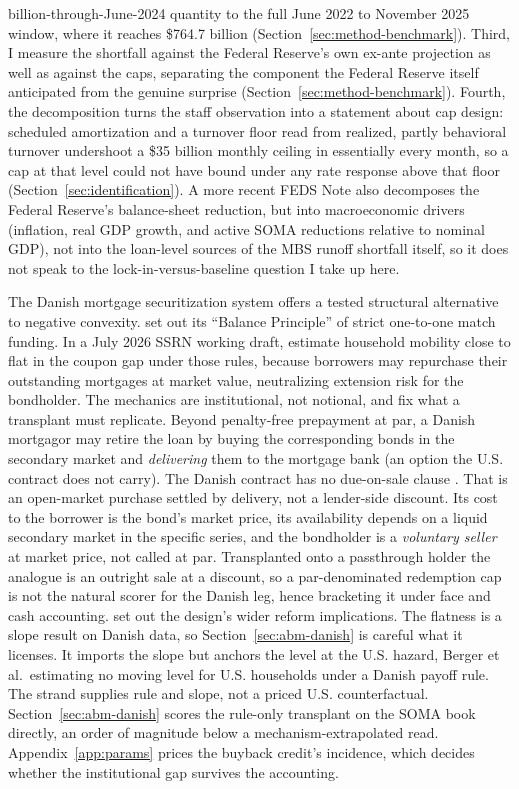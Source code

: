 \documentclass[12pt]{article}
\begin{document}
billion-through-June-2024 quantity to the full June 2022 to November 2025 window, where it reaches \$764.7 billion (Section~\ref{sec:method-benchmark}). Third, I measure the shortfall against the Federal Reserve's own ex-ante projection as well as against the caps, separating the component the Federal Reserve itself anticipated from the genuine surprise (Section~\ref{sec:method-benchmark}). Fourth, the decomposition turns the staff observation into a statement about cap design: scheduled amortization and a turnover floor read from realized, partly behavioral turnover undershoot a \$35 billion monthly ceiling in essentially every month, so a cap at that level could not have bound under any rate response above that floor (Section~\ref{sec:identification}). A more recent \citet{eyal2026} FEDS Note also decomposes the Federal Reserve's balance-sheet reduction, but into macroeconomic drivers (inflation, real GDP growth, and active SOMA reductions relative to nominal GDP), not into the loan-level sources of the MBS runoff shortfall itself, so it does not speak to the lock-in-versus-baseline question I take up here.

The Danish mortgage securitization system offers a tested structural alternative to negative convexity. \citet{berg2018} set out its ``Balance Principle'' of strict one-to-one match funding. In a July 2026 SSRN working draft, \citet[\S3.3.2]{berger2026} estimate household mobility close to flat in the coupon gap under those rules, because borrowers may repurchase their outstanding mortgages at market value, neutralizing extension risk for the bondholder. The mechanics are institutional, not notional, and fix what a transplant must replicate. Beyond penalty-free prepayment at par, a Danish mortgagor may retire the loan by buying the corresponding bonds in the secondary market and \emph{delivering} them to the mortgage bank (an option the U.S. contract does not carry). The Danish contract has no due-on-sale clause \citep{frankel2004}. That is an open-market purchase settled by delivery, not a lender-side discount. Its cost to the borrower is the bond's market price, its availability depends on a liquid secondary market in the specific series, and the bondholder is a \emph{voluntary seller} at market price, not called at par. Transplanted onto a passthrough holder the analogue is an outright sale at a discount, so a par-denominated redemption cap is not the natural scorer for the Danish leg, hence bracketing it under face and cash accounting. \citet{svenstrup2006} set out the design's wider reform implications. The flatness is a slope result on Danish data, so Section~\ref{sec:abm-danish} is careful what it licenses. It imports the slope but anchors the level at the U.S. hazard, Berger et al.\ estimating no moving level for U.S. households under a Danish payoff rule. The strand supplies rule and slope, not a priced U.S. counterfactual. Section~\ref{sec:abm-danish} scores the rule-only transplant on the SOMA book directly, an order of magnitude below a mechanism-extrapolated read. Appendix~\ref{app:params} prices the buyback credit's incidence, which decides whether the institutional gap survives the accounting.
\end{document}
